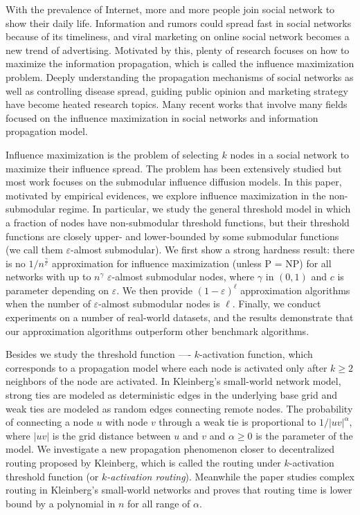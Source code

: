 \begin{englishabstract}

With the prevalence of Internet, more and more people join social network to show their daily life.
Information and rumors could spread fast in social networks because of its timeliness, and viral marketing on online social network becomes a new trend of advertising. 
Motivated by this, plenty of research focuses on how to maximize the information propagation, which is called the influence maximization problem.
Deeply understanding the propagation mechanisms of social networks as well as controlling disease spread,
guiding public opinion and marketing strategy have become heated research topics.
Many recent works that involve many fields focused on the influence maximization in social networks and information propagation model.

Influence maximization is the problem of selecting $k$ nodes in a social network to maximize their influence spread.
The problem has been extensively studied but most work focuses on the submodular influence diffusion models.
In this paper, motivated by empirical evidences, we explore influence maximization in the non-submodular regime.
In particular, we study the general threshold model in which a fraction of nodes have non-submodular threshold
	functions, but their threshold functions are closely upper- and lower-bounded by some submodular
	functions (we call them $\varepsilon$-almost submodular).
We first show a strong hardness result: there is no $1/n^{\frac{\gamma}{c}}$ approximation for influence maximization (unless P = NP)
	for all networks with up to $n^{\gamma}$ $\varepsilon$-almost submodular nodes, where $\gamma$ in $(0,1)$ 
	and $c$ is parameter depending on $\varepsilon$.
We then provide $(1-\varepsilon)^{\ell}$ approximation algorithms when the number of $\varepsilon$-almost submodular nodes is $\ell$.
Finally, we conduct experiments on a number of real-world datasets, and the results demonstrate that our approximation algorithms
	outperform other benchmark algorithms.

Besides we study the threshold function ---- $k$-activation function, 
which corresponds to a propagation model where each node is activated only
after $k \ge 2$ neighbors of the node are activated.
In Kleinberg's small-world network model, strong ties are modeled as deterministic edges in the
underlying base grid and weak ties are modeled as random edges connecting remote nodes.
The probability of connecting a node $u$ with node $v$ through a weak tie is proportional to
$1/|uv|^\alpha$, where $|uv|$ is the grid distance between $u$ and $v$ and $\alpha\ge 0$ is the
parameter of the model.
We investigate a new propagation phenomenon closer to decentralized routing proposed by Kleinberg,
which is called the routing under $k$-activation threshold function (or {\it $k$-activation routing}).
Meanwhile the paper studies complex routing in Kleinberg's small-world networks and proves that
routing time is lower bound by a polynomial in $n$ for all range of $\alpha$.


\end{englishabstract}
